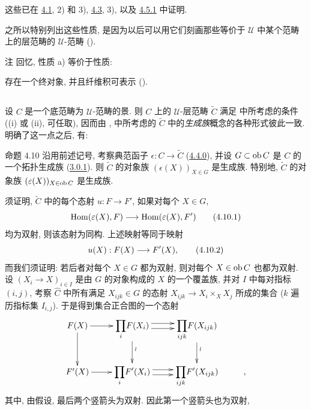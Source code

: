 这些已在 \hyperref[II.theo4.1]{4.1}, 2) 和 3),
\hyperref[II.prop4.3]{4.3}, 3), 以及 \hyperref[II.exem4.5.1]{4.5.1} 中证明.

之所以特别列出这些性质,
是因为以后可以用它们刻画那些等价于 $𝒰$ 中某个范畴上的层范畴的 $𝒰$-范畴
().

\begin{enonce*}[remark]{注}
回忆, 性质 a) 等价于性质:

存在一个终对象, 并且纤维积可表示
().
\end{enonce*}

\setcounter{subsection}{8}
\subsection{}
设\pageoriginale{} $C$ 是一个底范畴为 $𝒰$-范畴的景.
则 $C$ 上的 $𝒰$-层范畴 $\widetilde{C}$
满足  中所考虑的条件
((i) 或 (ii), 可任取),
因而由 \loccit{},
 中所考虑的
$\widetilde{C}$ 中的\emph{生成族}概念的各种形式彼此一致.
明确了这一点之后, 有:

\begin{enonce*}{命题 4.10}
沿用前述记号, 考察典范函子
$\epsilon:C\rightarrow\widetilde{C}$
(\hyperref[II.subsubsec4.4.0]{4.4.0}),
并设 $G\subset\operatorname{ob} C$ 是 $C$ 的一个拓扑生成族
(\hyperref[II.def3.0.1]{3.0.1}).
则 $\widetilde{C}$ 的对象族 $(\epsilon(X))_{X\in G}$ 是生成族.
特别地, $\widetilde{C}$ 的对象族
$(\varepsilon(X))_{X\in\operatorname{ob} C}$ 是生成族.
\end{enonce*}

须证明, $\widetilde{C}$ 中的每个态射 $u:F\rightarrow F'$,
如果对每个 $X\in G$,
\begin{equation}
\operatorname{Hom}(\varepsilon(X),F)\longrightarrow \operatorname{Hom}(\varepsilon(X),F')\tag{4.10.1}
\end{equation}
均为双射, 则该态射为同构.
上述映射等同于映射
\begin{equation}
u(X):F(X)\longrightarrow F'(X){},\tag{4.10.2}
\end{equation}
而我们须证明: 若后者对每个 $X\in G$ 都为双射,
则对每个 $X\in\operatorname{ob} C$ 也都为双射.
设 $(X_i\rightarrow X)_{i\in I}$ 是由 $G$ 的对象构成的 $X$ 的一个覆盖族,
并对 $I$ 中每对指标 $(i,j)$, 考察 $\widehat{C}$ 中所有满足
$X_{ijk}\in G$ 的态射 $X_{ijk}\rightarrow X_i\times_XX_j$
所成的集合 ($k$ 遍历指标集 $I_{i,j}$).
于是得到集合正合图的一个态射
\[
\xymatrix{ F(X) \ar[r] \ar[d]& \displaystyle{{\prod_i}} F(X_i)
\ar[d]^{\wr} \ar@<3pt>[r] \ar@<-3pt>[r] & \displaystyle{\prod_{ijk}}
F(X_{ijk}) \ar[d]^{\wr}\\
F'(X) \ar[r] & \displaystyle{{\prod_i}} F'(X_i) \ar@<3pt>[r]
\ar@<-3pt>[r] & \displaystyle{\prod_{ijk}} F'(X_{ijk})&, }
\]
其中\pageoriginale{}, 由假设, 最后两个竖箭头为双射.
因此第一个竖箭头也为双射, \cqfd

